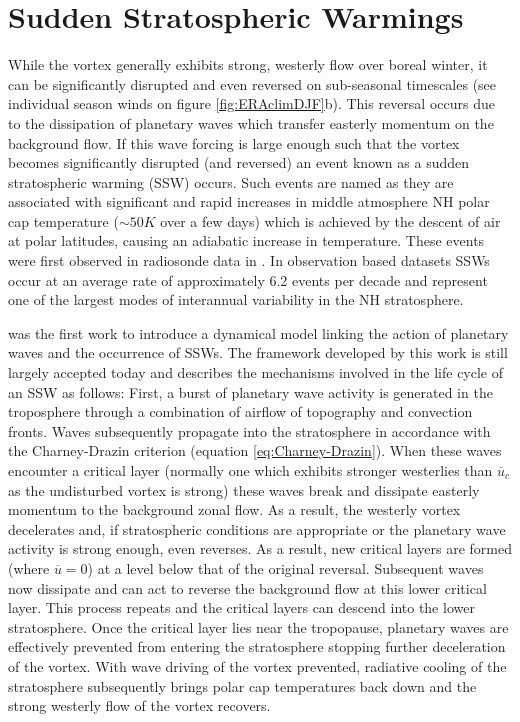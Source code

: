 \section{Sudden Stratospheric Warmings}
\label{sec:SSWs}
While the vortex generally exhibits strong, westerly flow over boreal winter, it can be significantly disrupted and even reversed on sub-seasonal timescales
(see individual season winds on figure \ref{fig:ERAclimDJF}b). This reversal occurs due to the dissipation of planetary waves which transfer easterly momentum on the background flow. If this wave forcing is large enough such that the vortex becomes significantly disrupted (and reversed) an event known as a sudden stratospheric warming (SSW) occurs. Such events are named as they are associated with significant and rapid increases in middle atmosphere NH polar cap temperature ($\sim50K$ over a few days) which is achieved by the descent of air at polar latitudes, causing an adiabatic increase in temperature. These events were first observed in radiosonde data in \cite{scherhagExplosionsartigen1952}. In observation based datasets SSWs occur at an average rate of approximately 6.2 events per decade \citep{butlerSudden2017} and represent one of the largest modes of interannual variability in the NH stratosphere.

\cite{matsunoDynamical1971b} was the first work to introduce a dynamical model linking the action of planetary waves and the occurrence of SSWs. The framework developed by this work is still largely accepted today and describes the mechanisms involved in the life cycle of an SSW as follows: First, a burst of planetary wave activity is generated in the troposphere through a combination of airflow of topography and convection fronts. Waves subsequently propagate into the stratosphere in accordance with the Charney-Drazin criterion (equation \ref{eq:Charney-Drazin}). When these waves encounter a critical layer (normally one which exhibits stronger westerlies than $\overline{u}_c$ as the undisturbed vortex is strong) these waves break and dissipate easterly momentum to the background zonal flow. As a result, the westerly vortex decelerates and, if stratospheric conditions are appropriate or the planetary wave activity is strong enough, even reverses. As a result, new critical layers are formed (where $\overline{u} = 0$) at a level below that of the original reversal. Subsequent waves now dissipate and can act to reverse the background flow at this lower critical layer. This process repeats and the critical layers can descend into the lower stratosphere. Once the critical layer lies near the tropopause, planetary waves are effectively prevented from entering the stratosphere stopping further deceleration of the vortex. With wave driving of the vortex prevented, radiative cooling of the stratosphere subsequently brings polar cap temperatures back down and the strong westerly flow of the vortex recovers.

